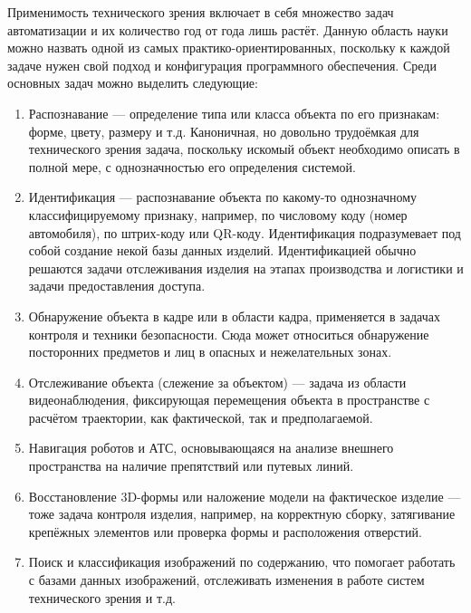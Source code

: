 Применимость технического зрения включает в себя множество задач автоматизации и их количество год от года лишь растёт. Данную область науки можно назвать одной из самых практико-ориентированных, поскольку к каждой задаче нужен свой подход и конфигурация программного обеспечения. Среди основных задач можно выделить следующие:

\begin{enumerate}
	\item Распознавание --- определение типа или класса объекта по его признакам: форме, цвету, размеру и т.д. Каноничная, но довольно трудоёмкая для технического зрения задача, поскольку искомый объект необходимо описать в полной мере, с однозначностью его определения системой.
	\item Идентификация --- распознавание объекта по какому-то однозначному классифицируемому признаку, например, по числовому коду (номер автомобиля), по штрих-коду или QR-коду. Идентификация подразумевает под собой создание некой базы данных изделий. Идентификацией обычно решаются задачи отслеживания изделия на этапах производства и логистики и задачи предоставления доступа.
	\item Обнаружение объекта в кадре или в области кадра, применяется в задачах контроля и техники безопасности. Сюда может относиться обнаружение посторонних предметов и лиц в опасных и нежелательных зонах.
	\item Отслеживание объекта (слежение за объектом) --- задача из области видеонаблюдения, фиксирующая перемещения объекта в пространстве с расчётом траектории, как фактической, так и предполагаемой.
	\item Навигация роботов и АТС, основывающаяся на анализе внешнего пространства на наличие препятствий или путевых линий. 
	\item Восстановление 3D-формы или наложение модели на фактическое изделие --- тоже задача контроля изделия, например, на корректную сборку, затягивание крепёжных элементов или проверка формы и расположения отверстий.
	\item Поиск и классификация изображений по содержанию, что помогает работать с базами данных изображений, отслеживать изменения в работе систем технического зрения и т.д.
\end{enumerate}


